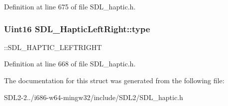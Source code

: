 Definition at line 675 of file S\+D\+L\+\_\+haptic.\+h.

\hypertarget{structSDL__HapticLeftRight_abef79eeb482a8e623e512f0c9635e1a1}{
\subsubsection[{type}]{\setlength{\rightskip}{0pt plus 5cm}Uint16 S\+D\+L\+\_\+\+Haptic\+Left\+Right\+::type}}\label{structSDL__HapticLeftRight_abef79eeb482a8e623e512f0c9635e1a1}
\+::\+S\+D\+L\+\_\+\+H\+A\+P\+T\+I\+C\+\_\+\+L\+E\+F\+T\+R\+I\+G\+H\+T 

Definition at line 668 of file S\+D\+L\+\_\+haptic.\+h.



The documentation for this struct was generated from the following file\+:\begin{DoxyCompactItemize}
\item 
S\+D\+L2-\/2../i686-\/w64-\/mingw32/include/\+S\+D\+L2/S\+D\+L\+\_\+haptic.\+h\end{DoxyCompactItemize}
